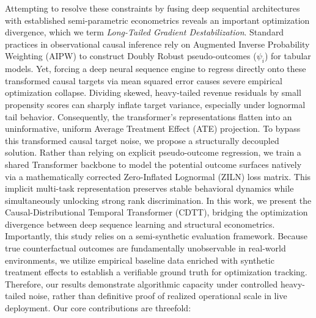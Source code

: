 \documentclass[10pt, conference]{IEEEtran}
\begin{document}
Attempting to resolve these constraints by fusing deep sequential architectures with established semi-parametric econometrics reveals an important optimization divergence, which we term \textit{Long-Tailed Gradient Destabilization}. Standard practices in observational causal inference rely on Augmented Inverse Probability Weighting (AIPW) to construct Doubly Robust pseudo-outcomes ($\psi_i$) for tabular models. Yet, forcing a deep neural sequence engine to regress directly onto these transformed causal targets via mean squared error causes severe empirical optimization collapse. Dividing skewed, heavy-tailed revenue residuals by small propensity scores can sharply inflate target variance, especially under lognormal tail behavior. Consequently, the transformer's representations flatten into an uninformative, uniform Average Treatment Effect (ATE) projection. To bypass this transformed causal target noise, we propose a structurally decoupled solution. Rather than relying on explicit pseudo-outcome regression, we train a shared Transformer backbone to model the potential outcome surfaces natively via a mathematically corrected Zero-Inflated Lognormal (ZILN) loss matrix. This implicit multi-task representation preserves stable behavioral dynamics while simultaneously unlocking strong rank discrimination.
In this work, we present the Causal-Distributional Temporal Transformer (CDTT), bridging the optimization divergence between deep sequence learning and structural econometrics. Importantly, this study relies on a semi-synthetic evaluation framework. Because true counterfactual outcomes are fundamentally unobservable in real-world environments, we utilize empirical baseline data enriched with synthetic treatment effects to establish a verifiable ground truth for optimization tracking. Therefore, our results demonstrate algorithmic capacity under controlled heavy-tailed noise, rather than definitive proof of realized operational scale in live deployment. Our core contributions are threefold:
\end{document}

